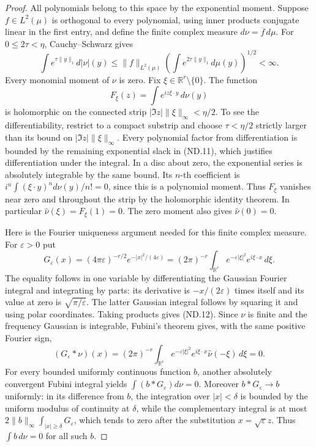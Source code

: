 \begin{proof}
All polynomials belong to this space by the exponential moment. Suppose
\(f\in L^2(\mu)\) is orthogonal to every polynomial, using inner
products conjugate linear in the first entry, and define the finite
complex measure \(d\nu=\overline f\,d\mu\). For \(0\le2\tau<\eta\),
Cauchy--Schwarz gives
\[
 \int e^{\tau\|y\|_1}d|\nu|(y)
 \le\|f\|_{L^2(\mu)}
       \left(\int e^{2\tau\|y\|_1}d\mu(y)\right)^{1/2}<\infty.
 \tag{ND.11}
\]
Every monomial moment of \(\nu\) is zero. Fix
\(\xi\in\mathbb R^r\setminus\{0\}\). The function
\[
 F_\xi(z)=\int e^{iz\xi\cdot y}\,d\nu(y)
\]
is holomorphic on the connected strip
\(|\Im z|\|\xi\|_\infty<\eta/2\). To see the differentiability,
restrict to a compact substrip and choose \(\tau<\eta/2\) strictly
larger than its bound on \(|\Im z|\|\xi\|_\infty\). Every
polynomial factor from differentiation is bounded by the remaining
exponential slack in (ND.11), which justifies differentiation under
the integral. In a disc about zero, the exponential series is
absolutely integrable by the same bound. Its \(n\)-th coefficient
is \(i^n\int(\xi\cdot y)^n d\nu(y)/n!=0\), since this is a
polynomial moment. Thus \(F_\xi\) vanishes near zero and throughout
the strip by the holomorphic identity theorem. In particular
\(\widehat\nu(\xi)=F_\xi(1)=0\). The zero moment also gives
\(\widehat\nu(0)=0\).

Here is the Fourier uniqueness argument needed for this finite complex
measure. For \(\varepsilon>0\) put
\[
 G_\varepsilon(x)=(4\pi\varepsilon)^{-r/2}
                  e^{-|x|^2/(4\varepsilon)}
  =(2\pi)^{-r}\int_{\mathbb R^r}
                  e^{-\varepsilon|\xi|^2}e^{i\xi\cdot x}\,d\xi.
 \tag{ND.12}
\]
The equality follows in one variable by differentiating the Gaussian
Fourier integral and integrating by parts: its derivative is
\(-x/(2\varepsilon)\) times itself and its value at zero is
\(\sqrt{\pi/\varepsilon}\). The latter Gaussian integral follows
by squaring it and using polar coordinates. Taking products gives
(ND.12). Since \(\nu\) is finite and the frequency Gaussian is
integrable, Fubini's theorem gives, with the same positive Fourier sign,
\[
 (G_\varepsilon*\nu)(x)=(2\pi)^{-r}\int_{\mathbb R^r}
 e^{-\varepsilon|\xi|^2}e^{i\xi\cdot x}\widehat\nu(-\xi)\,d\xi=0.
\]
For every bounded uniformly
continuous function \(b\), another absolutely convergent Fubini
integral yields \(\int(b*G_\varepsilon)d\nu=0\). Moreover
\(b*G_\varepsilon\to b\) uniformly: in its difference from \(b\),
the integration over \(|x|<\delta\) is bounded by the uniform
modulus of continuity at \(\delta\), while the complementary
integral is at most \(2\|b\|_\infty\int_{|x|\ge\delta}G_\varepsilon\),
which tends to zero after the substitution \(x=\sqrt\varepsilon z\).
Thus \(\int b\,d\nu=0\) for all such \(b\).


\end{proof}
